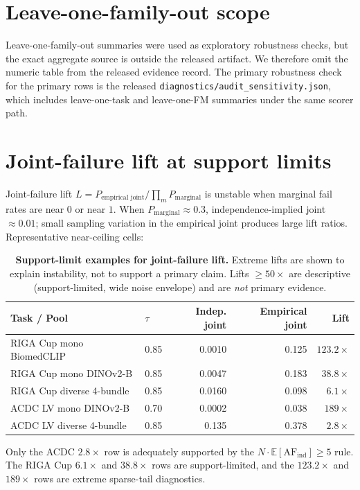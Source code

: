 \section{Leave-one-family-out scope}
\label{app:lofo}

Leave-one-family-out summaries were used as exploratory robustness checks, but the
exact aggregate source is outside the released artifact. We therefore omit the
numeric table from the released evidence record. The primary
robustness check for the primary rows is the released
\texttt{diagnostics/audit\_sensitivity.json}, which includes leave-one-task and
leave-one-FM summaries under the same scorer path.

\section{Joint-failure lift at support limits}
\label{app:lift-ceiling}
Joint-failure lift $L{=}P_{\text{empirical joint}}/\prod_m P_{\text{marginal}}$ is unstable when marginal fail rates are near $0$ or near $1$. When $P_{\text{marginal}}\approx 0.3$, independence-implied joint $\approx 0.01$; small sampling variation in the empirical joint produces large lift ratios. Representative near-ceiling cells:
\begin{table}[!htbp]
  \caption{\textbf{Support-limit examples for joint-failure lift.} Extreme lifts are shown to explain instability, not to support a primary claim. Lifts $\ge 50\times$ are descriptive (support-limited, wide noise envelope) and are \emph{not} primary evidence.}
  \label{tab:lift-ceiling}
  \centering\small
  \begin{tabular}{llrrr}
    \toprule
    Task / Pool & $\tau$ & Indep. joint & Empirical joint & Lift \\
    \midrule
    RIGA Cup mono BiomedCLIP  & 0.85 & 0.0010 & 0.125 & $123.2\times$ \\
    RIGA Cup mono DINOv2-B    & 0.85 & 0.0047 & 0.183 & $38.8\times$ \\
    RIGA Cup diverse 4-bundle & 0.85 & 0.0160 & 0.098 & $6.1\times$ \\
    ACDC LV mono DINOv2-B     & 0.70 & 0.0002 & 0.038 & $189\times$ \\
    ACDC LV diverse 4-bundle  & 0.85 & 0.135  & 0.378 & $2.8\times$ \\
    \bottomrule
  \end{tabular}
\end{table}
Only the ACDC $2.8\times$ row is adequately supported by the $N\cdot\mathbb{E}[\mathrm{AF}_{\mathrm{ind}}]\geq5$ rule. The RIGA Cup $6.1\times$ and $38.8\times$ rows are support-limited, and the $123.2\times$ and $189\times$ rows are extreme sparse-tail diagnostics.


